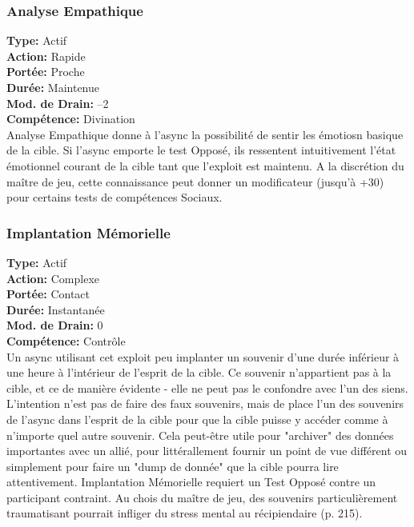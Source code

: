 \subsubsection{Analyse Empathique} \textbf{Type:} Actif \\ \textbf{Action:} Rapide \\ \textbf{Portée:} Proche \\ \textbf{Durée:} Maintenue \\ \textbf{Mod. de Drain:} –2 \\ \textbf{Compétence:} Divination \\ Analyse Empathique donne à l'async la possibilité de sentir les émotiosn basique de la cible. Si l'async emporte le test Opposé, ils ressentent intuitivement l'état émotionnel courant de la cible tant que l'exploit est maintenu. A la discrétion du maître de jeu, cette connaissance peut donner un modificateur (jusqu'à +30) pour certains tests de compétences Sociaux. 

\subsubsection{Implantation Mémorielle} \textbf{Type:} Actif \\ \textbf{Action:} Complexe \\ \textbf{Portée:} Contact \\ \textbf{Durée:} Instantanée \\ \textbf{Mod. de Drain:} 0 \\ \textbf{Compétence:} Contrôle \\ Un async utilisant cet exploit peu implanter un souvenir d'une durée inférieur à une heure à l'intérieur de l'esprit de la cible. Ce souvenir n'appartient pas à la cible, et ce de manière évidente - elle ne peut pas le confondre avec l'un des siens. L'intention n'est pas de faire des faux souvenirs, mais de place l'un des souvenirs de l'async dans l'esprit de la cible pour que la cible puisse y accéder comme à n'importe quel autre souvenir. Cela peut-être utile pour "archiver" des données importantes avec un allié, pour littérallement fournir un point de vue différent ou simplement pour faire un "dump de donnée"  que la cible pourra lire attentivement. Implantation Mémorielle requiert un Test Opposé contre un participant contraint. Au chois du maître de jeu, des souvenirs particulièrement traumatisant pourrait infliger du stress mental au récipiendaire (p. 215). 

